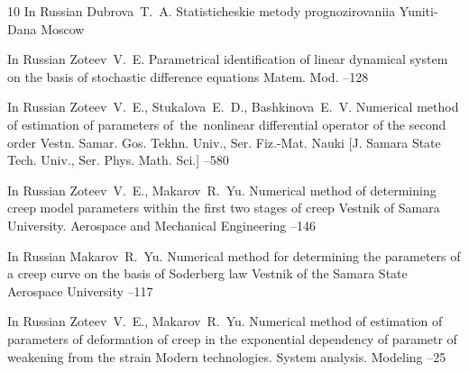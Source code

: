 \begin{thebibliography}{10}
\lang In Russian
\by Dubrova~T.~A. 
\book Statisticheskie metody prognozirovaniia
\publ Yuniti-Dana
\publaddr Moscow


\lang In Russian
\by Zoteev~V.~E.
\paper Parametrical identification of linear dynamical system on the basis of stochastic difference equations
\jour Matem. Mod.
--128

\lang In Russian
\by Zoteev~V.~E., Stukalova~E.~D., Bashkinova~E.~V.
\paper Numerical method of estimation of parameters
of~the~nonlinear differential operator of the second order
\jour Vestn. Samar. Gos. Tekhn. Univ., Ser. Fiz.-Mat. Nauki \rm [J. Samara State Tech. Univ., Ser. Phys. Math. Sci.]
--580



\lang In Russian
\by Zoteev~V.~E., Makarov~R.~Yu.
\paper Numerical method of determining creep model parameters within the first two stages of creep
\jour Vestnik of Samara University. Aerospace and Mechanical Engineering 
--146



\lang In Russian
\by Makarov~R.~Yu.   
\paper Numerical method for determining the parameters of a creep curve on the basis of Soderberg law 
\jour  Vestnik of the Samara State Aerospace University
--117


\lang In Russian
\by Zoteev~V.~E., Makarov~R.~Yu.
\paper   Numerical method of estimation of parameters of deformation of creep in the exponential dependency of parametr of weakening from the strain
\jour Modern technologies. System analysis. Modeling 
--25



\end{thebibliography}


\renewcommand{\baselinestretch}{0.9}




%
